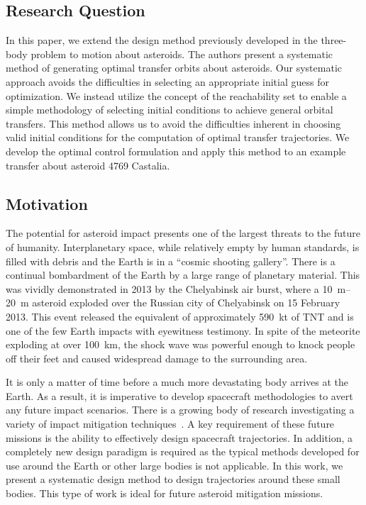 \documentclass[11pt,reqno]{amsart} %
\begin{document}
\begin{multicols}{2}
\subsection{Research Question}
In this paper, we extend the design method previously developed in the three-body problem to motion about asteroids.
The authors present a systematic method of generating optimal transfer orbits about asteroids.
Our systematic approach avoids the difficulties in selecting an appropriate initial guess for optimization.
We instead utilize the concept of the reachability set to enable a simple methodology of selecting initial conditions to achieve general orbital transfers.
This method allows us to avoid the difficulties inherent in choosing valid initial conditions for the computation of optimal transfer trajectories.
We develop the optimal control formulation and apply this method to an example transfer about asteroid 4769 Castalia.

\subsection{Motivation}

The potential for asteroid impact presents one of the largest threats to the future of humanity.
Interplanetary space, while relatively empty by human standards, is filled with debris and the Earth is in a ``cosmic shooting gallery''.
There is a continual bombardment of the Earth by a large range of planetary material.
This was vividly demonstrated in 2013 by the Chelyabinsk air burst, where a \SIrange{10}{20}{\meter} asteroid exploded over the Russian city of Chelyabinsk on  15 February 2013.
This event released the equivalent of approximately \SI{590}{\kilo\tonne} of TNT and is one of the few Earth impacts with eyewitness testimony.
In spite of the meteorite exploding at over \SI{100}{\kilo\meter}, the shock wave was powerful enough to knock people off their feet and caused widespread damage to the surrounding area.

It is only a matter of time before a much more devastating body arrives at the Earth.
As a result, it is imperative to develop spacecraft methodologies to avert any future impact scenarios.
There is a growing body of research investigating a variety of impact mitigation techniques~\cite{wie2008,pitz2014}.
A key requirement of these future missions is the ability to effectively design spacecraft trajectories. 
In addition, a completely new design paradigm is required as the typical methods developed for use around the Earth or other large bodies is not applicable. 
In this work, we present a systematic design method to design trajectories around these small bodies. 
This type of work is ideal for future asteroid mitigation missions.


\end{multicols}
\end{document}
